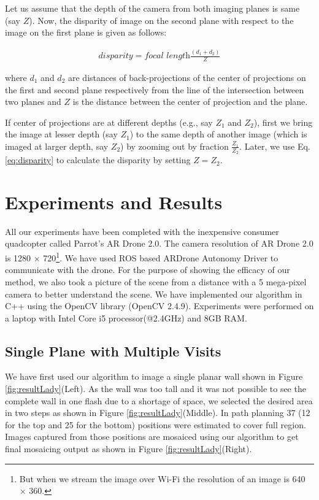 Let us assume that the depth of the camera from both imaging planes is same
(say $Z$). Now, the disparity of image on the second plane with respect to the
image on the first plane is given as follows\cite{Prasad16}:
\begin{ceqn}
\begin{align}
\textit{disparity} = \textit{focal length}\frac{(d_1+d_2)}{Z}
\label{eq:disparity}
\end{align}
\end{ceqn}

where $d_1$ and $d_2$ are distances of back-projections of the center of
projections on the first and second plane respectively from the line of
the intersection between two planes and $Z$ is the distance between the center of
projection and the plane.

If center of projections are at different depths (e.g., say $Z_1$ and
$Z_2$), first we bring the image at lesser depth (say $Z_1$) to the same depth
of another image (which is imaged at larger depth, say $Z_2$) by zooming out by
fraction $\frac{Z_1}{Z_2}$. Later, we use Eq. \ref{eq:disparity} to calculate
the disparity by setting $Z=Z_2$.

\section{Experiments and Results}
All our experiments have been completed with the inexpensive consumer
quadcopter called  Parrot’s AR Drone 2.0. The camera resolution of AR Drone 2.0
is 1280 $\times$ 720\footnote{But when we stream the image over Wi-Fi the resolution
of an image is 640 $\times$ 360.}. We have used ROS based ARDrone Autonomy
Driver to communicate with the drone. For the purpose of showing the efficacy
of our method, we also took a picture of the scene from a distance with a 5
mega-pixel camera to better understand the scene. We have implemented our
algorithm in C++ using the OpenCV library (OpenCV 2.4.9).  Experiments were
performed on a laptop with Intel Core i5 processor(@2.4GHz) and 8GB RAM.

\subsection{Single Plane with Multiple Visits}
We have first used our algorithm to image a single planar wall shown in
Figure \ref{fig:resultLady}(Left). As the wall was too tall and it was not
possible to see the complete wall in one flash due to a shortage of space, we selected the
desired area in two steps as shown in Figure  \ref{fig:resultLady}(Middle). In path planning 37 (12
for the top and 25 for the bottom) positions were estimated to cover full region. Images
captured from those positions are mosaiced using our algorithm to get final
mosaicing output as shown in Figure \ref{fig:resultLady}(Right).

